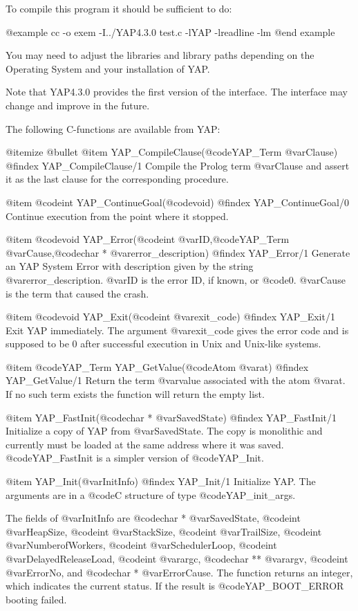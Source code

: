 {{{{{{{{{To compile this program it should be sufficient to do:

@example
cc -o exem -I../YAP4.3.0 test.c -lYAP -lreadline -lm
@end example

You may need to adjust the libraries and library paths depending on the
Operating System and your installation of YAP.

Note that YAP4.3.0 provides the first version of the interface. The
interface may change and improve in the future.

The following C-functions are available from YAP:

@itemize @bullet
@item  YAP_CompileClause(@code{YAP_Term} @var{Clause})
@findex  YAP_CompileClause/1
Compile the Prolog term @var{Clause} and assert it as the last clause
for the corresponding procedure.

@item  @code{int} YAP_ContinueGoal(@code{void})
@findex YAP_ContinueGoal/0
Continue execution from the point where it stopped.

@item  @code{void} YAP_Error(@code{int} @var{ID},@code{YAP_Term} @var{Cause},@code{char *} @var{error_description})
@findex YAP_Error/1
Generate an YAP System Error with description given by the string
@var{error_description}. @var{ID} is the error ID, if known, or
@code{0}. @var{Cause} is the term that caused the crash.

@item  @code{void} YAP_Exit(@code{int} @var{exit_code})
@findex YAP_Exit/1
Exit YAP immediately. The argument @var{exit_code} gives the error code
and is supposed to be 0 after successful execution in Unix and Unix-like
systems.

@item  @code{YAP_Term} YAP_GetValue(@code{Atom} @var{at})
@findex  YAP_GetValue/1
Return the term @var{value} associated with the atom @var{at}. If no
such term exists the function will return the empty list.

@item  YAP_FastInit(@code{char *} @var{SavedState})
@findex  YAP_FastInit/1
Initialize a copy of YAP from @var{SavedState}. The copy is
monolithic and currently must be loaded at the same address where it was
saved. @code{YAP_FastInit} is a simpler version of @code{YAP_Init}.

@item  YAP_Init(@var{InitInfo})
@findex  YAP_Init/1
Initialize YAP. The arguments are in a @code{C}
structure of type @code{YAP_init_args}.

The fields of @var{InitInfo} are @code{char *} @var{SavedState},
@code{int} @var{HeapSize}, @code{int} @var{StackSize}, @code{int}
@var{TrailSize}, @code{int} @var{NumberofWorkers}, @code{int}
@var{SchedulerLoop}, @code{int} @var{DelayedReleaseLoad}, @code{int}
@var{argc}, @code{char **} @var{argv}, @code{int} @var{ErrorNo}, and
@code{char *} @var{ErrorCause}. The function returns an integer, which
indicates the current status. If the result is @code{YAP_BOOT_ERROR}
booting failed.

}}}}}}}}}
